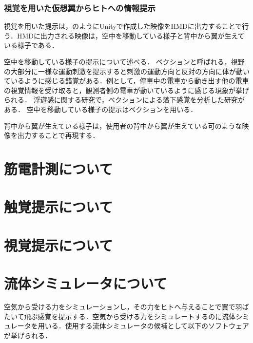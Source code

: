     \subsubsection{視覚を用いた仮想翼からヒトへの情報提示}
 
        視覚を用いた提示は，のようにUnityで作成した映像をHMDに出力することで行う．HMDに出力される映像は，空中を移動している様子と背中から翼が生えている様子である．

        空中を移動している様子の提示について述べる．
        ベクションと呼ばれる，視野の大部分に一様な運動刺激を提示すると刺激の運動方向と反対の方向に体が動いているように感じる錯覚がある\cite{妹尾武治2014ベクションとその周辺の近年の動向}．例として，停車中の電車から動き出す他の電車の視覚情報を受け取ると，観測者側の電車が動いているように感じる現象が挙げられる．
        浮遊感に関する研究で，ベクションによる落下感覚を分析した研究がある\cite{奥川夏輝2017VR空間における視覚刺激によって発生する落下感覚の分析}．
        空中を移動している様子の提示はベクションを用いる．

        背中から翼が生えている様子は，使用者の背中から翼が生えている可のような映像を出力することで再現する．  


\section{筋電計測について}

\section{触覚提示について}

\section{視覚提示について}

\section{流体シミュレータについて} 
    空気から受ける力をシミュレーションし，その力をヒトへ与えることで翼で羽ばたいて飛ぶ感覚を提示する．空気から受ける力をシミュレートするのに流体シミュレータを用いる．使用する流体シミュレータの候補として以下のソフトウェアが挙げられる．

